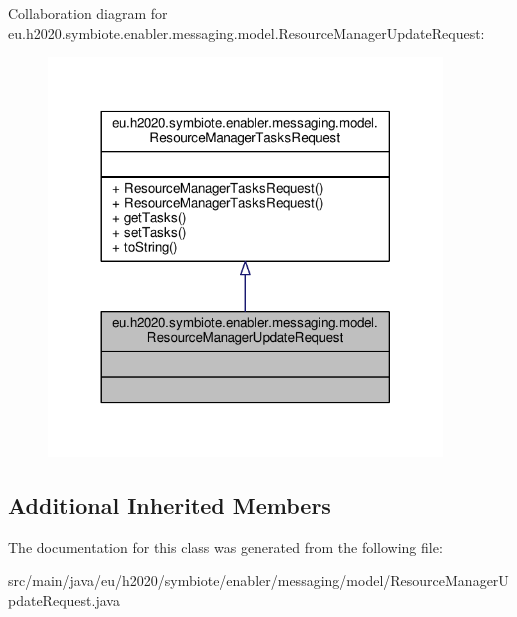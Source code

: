 Collaboration diagram for eu.\+h2020.\+symbiote.\+enabler.\+messaging.\+model.\+Resource\+Manager\+Update\+Request\+:\nopagebreak
\begin{figure}[H]
\begin{center}
\leavevmode
\includegraphics[width=296pt]{classeu_1_1h2020_1_1symbiote_1_1enabler_1_1messaging_1_1model_1_1ResourceManagerUpdateRequest__coll__graph}
\end{center}
\end{figure}
\subsection*{Additional Inherited Members}


The documentation for this class was generated from the following file\+:\begin{DoxyCompactItemize}
\item 
src/main/java/eu/h2020/symbiote/enabler/messaging/model/Resource\+Manager\+Update\+Request.\+java\end{DoxyCompactItemize}
